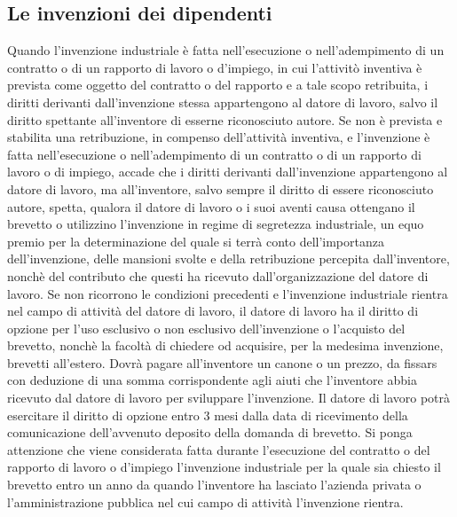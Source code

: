 \subsection{Le invenzioni dei dipendenti}
Quando l'invenzione industriale è fatta nell'esecuzione o nell'adempimento di un contratto o di un rapporto di lavoro o d'impiego, in cui
l'attivitò inventiva è prevista come oggetto del contratto o del rapporto e a tale scopo retribuita, i diritti derivanti dall'invenzione stessa
appartengono al datore di lavoro, salvo il diritto spettante all'inventore di esserne riconosciuto autore.\newline
Se non è prevista e stabilita una retribuzione, in compenso dell'attività inventiva, e l'invenzione è fatta nell'esecuzione o nell'adempimento
di un contratto o di un rapporto di lavoro o di impiego, accade che i diritti derivanti dall'invenzione appartengono al datore di lavoro,
ma all'inventore, salvo sempre il diritto di essere riconosciuto autore, spetta, qualora il datore di lavoro o i suoi aventi causa ottengano il brevetto
o utilizzino l'invenzione in regime di segretezza industriale, un equo premio per la determinazione del quale si terrà conto dell'importanza
dell'invenzione, delle mansioni svolte e della retribuzione percepita dall'inventore, nonchè del contributo che questi ha ricevuto dall'organizzazione
del datore di lavoro.\newline
Se non ricorrono le condizioni precedenti e l'invenzione industriale rientra nel campo di attività del datore di lavoro, il datore di lavoro
ha il diritto di opzione per l'uso esclusivo o non esclusivo dell'invenzione o l'acquisto del brevetto, nonchè la facoltà di chiedere od acquisire, per
la medesima invenzione, brevetti all'estero. Dovrà pagare all'inventore un canone o un prezzo, da fissars con deduzione di una somma corrispondente agli aiuti
che l'inventore abbia ricevuto dal datore di lavoro per sviluppare l'invenzione. Il datore di lavoro potrà esercitare il diritto di opzione entro 3 mesi
dalla data di ricevimento della comunicazione dell'avvenuto deposito della domanda di brevetto.\newline
\newline
Si ponga attenzione che viene considerata fatta durante l'esecuzione del contratto o del rapporto di lavoro o d'impiego l'invenzione industriale
per la quale sia chiesto il brevetto entro un anno da quando l'inventore ha lasciato l'azienda privata o l'amministrazione pubblica nel cui campo di
attività l'invenzione rientra.

